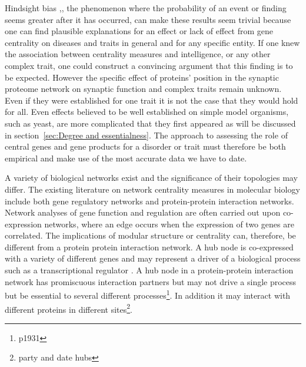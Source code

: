  Hindsight bias \cite{fischhoff1975hindsight},\cite{fischhoff2007early}, the phenomenon where the probability of an event or finding seems greater after it has occurred, can make these results seem trivial because one can find plausible explanations for an effect or lack of effect from gene centrality on diseases and traits in general and for any specific entity. If one knew the association between centrality measures and intelligence, or any other complex trait, one could construct a convincing argument that this finding is to be expected. However the specific effect of proteins' position in the synaptic proteome network on synaptic function and complex traits remain unknown. Even if they were established for one trait it is not the case that they would hold for all. Even effects believed to be well established on simple model organisms, such as yeast, are more complicated that they first appeared as will be discussed in section~\ref{sec:Degree and essentialness}. The approach to assessing the role of central genes and gene products for a disorder or trait must therefore be both empirical and make use of the most accurate data we have to date. 
 
 A variety of biological networks exist and the significance of their topologies may differ. The existing literature on network centrality measures in molecular biology include both  gene regulatory networks and protein-protein interaction networks. Network analyses of gene function and regulation are often carried out upon co-expression networks, where an edge occurs when the expression of two genes are correlated\cite{zhang2005general}. The implications of modular structure or centrality can, therefore, be different from a protein protein interaction network. A hub node is co-expressed with a variety of different genes and may represent a driver of a biological process such as a transcriptional regulator \cite{parikshak2015systems}.
 A hub node in a protein-protein interaction network has promiscuous interaction partners but may not drive a single process but be essential to several different processes\cite{patil2010hub}\footnote{p1931}. In addition it may interact with different proteins in different sites\cite{han2004evidence}\footnote{party and date hubs}.
 
